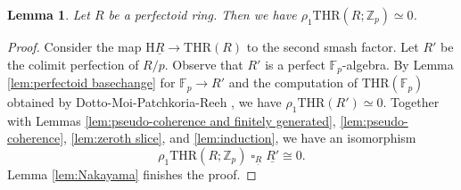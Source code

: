 \documentclass[10pt]{amsart}
\newtheorem{lem}[thm]{Lemma}
\theoremstyle{definition}
\numberwithin{equation}{section}
\newcommand{\F}{\mathbb{F}}
\newcommand{\Z}{\mathbb{Z}}
\newcommand{\rH}{\mathrm{H}}
\newcommand{\ul}{\underline}
\DeclareMathOperator{\sotimes}{\square}
\newcommand{\THR}{\mathrm{THR}}
\begin{document}
\begin{lem}
\label{lem:first slice}
Let $R$ be a perfectoid ring.
Then we have $\rho_1\THR(R;\Z_p)\simeq 0$.
\end{lem}
\begin{proof}
Consider the map $\rH\ul{R} \to \THR(R)$ to the second smash factor.
Let $R'$ be the colimit perfection of $R/p$.
Observe that $R'$ is a perfect $\F_p$-algebra.
By Lemma \ref{lem:perfectoid basechange} for $\F_p\to R'$ and the computation of $\THR(\F_p)$ obtained by Dotto-Moi-Patchkoria-Reeh \cite[Theorem 5.15]{DMPR21},
we have $\rho_1\THR(R')\simeq 0$.
Together with Lemmas \ref{lem:pseudo-coherence and finitely generated}, \ref{lem:pseudo-coherence}, \ref{lem:zeroth slice}, and \ref{lem:induction},
we have an isomorphism
\[
\rho_1\THR(R;\Z_p)\sotimes_{\ul{R}}\ul{R'}
\cong
0.
\]
Lemma \ref{lem:Nakayama} finishes the proof.
\end{proof}
\end{document}
